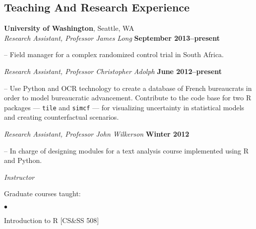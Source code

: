 \documentclass[margin,line]{res}
\newenvironment{list1}{
  \begin{list}{\ding{113}}{%
      \setlength{\itemsep}{0in}
      \setlength{\parsep}{0in} \setlength{\parskip}{0in}
      \setlength{\topsep}{0in} \setlength{\partopsep}{0in} 
      \setlength{\leftmargin}{0.17in}}}{\end{list}}
\newenvironment{list2}{
  \begin{list}{$\bullet$}{%
      \setlength{\itemsep}{0in}
      \setlength{\parsep}{0in} \setlength{\parskip}{0in}
      \setlength{\topsep}{0in} \setlength{\partopsep}{0in} 
      \setlength{\leftmargin}{0.2in}}}{\end{list}}
\begin{document}
{\begin{resume}
\section{\sc Teaching And Research Experience}
{\bf University of Washington}, Seattle, WA \\
{\em Research Assistant, Professor James Long} \hfill {\bf September 2013--present}\\
\vspace{-.1in}
\begin{list1}
\item[]-- Field manager for a complex randomized control trial in South Africa.
\end{list1}
{\em Research Assistant, Professor Christopher Adolph} \hfill {\bf June 2012--present}\\
\vspace{-.1in}
\begin{list1}
\item[]-- Use Python and OCR technology to create a database of French
bureaucrats in order to model bureaucratic advancement. Contribute to
the code base for two R packages --- \texttt{tile} and
\texttt{simcf} --- for visualizing uncertainty in
statistical models and creating counterfactual scenarios. 
\end{list1}
{\em Research Assistant, Professor John Wilkerson} \hfill {\bf Winter 2012}\\
\vspace{-.1in}
\begin{list1}
\item[]-- In charge of designing modules for a text analysis course implemented using R
and Python. 
\end{list1}

{\em Instructor}\\
\vspace{-.1in}
\begin{list1}
 \item[] Graduate courses taught:
   \begin{list2}
   \item[] Introduction to R  [CS\&SS 508]
\end{list2}
\end{list1}


\end{resume}}
\end{document}
